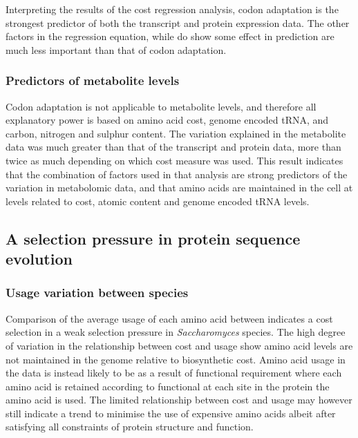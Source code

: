 Interpreting the results of the cost regression analysis, codon adaptation is the strongest predictor of both the transcript and protein expression data. The other factors in the regression equation, while do show some effect in prediction are much less important than that of codon adaptation.

\subsubsection{Predictors of metabolite levels}

Codon adaptation is not applicable to metabolite levels, and therefore all explanatory power is based on amino acid cost, genome encoded tRNA, and carbon, nitrogen and sulphur content. The variation explained in the metabolite data was much greater than that of the transcript and protein data, more than twice as much depending on which cost measure was used. This result indicates that the combination of factors used in that analysis are strong predictors of the variation in metabolomic data, and that amino acids are maintained in the cell at levels related to cost, atomic content and genome encoded tRNA levels.

\subsection{A selection pressure in protein sequence evolution}

\subsubsection{Usage variation between species}

Comparison of the average usage of each amino acid between indicates a cost selection in a weak selection pressure in \emph{Saccharomyces} species. The high degree of variation in the relationship between cost and usage show amino acid levels are not maintained in the genome relative to biosynthetic cost. Amino acid usage in the data is instead likely to be as a result of functional requirement where each amino acid is retained according to functional at each site in the protein the amino acid is used. The limited relationship between cost and usage may however still indicate a trend to minimise the use of expensive amino acids albeit after satisfying all constraints of protein structure and function.

